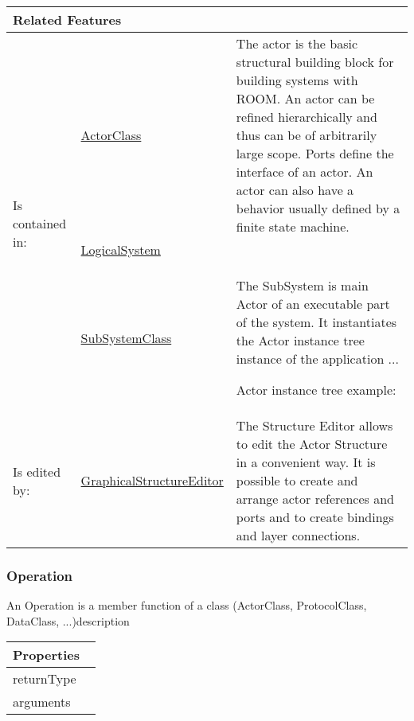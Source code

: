			\vspace{\baselineskip}
			\begingroup
			\renewcommand{\arraystretch}{1.8} %
			\parbox{\textwidth}{
			\begin{longtable}{l l p{}}
				\multicolumn{2}{l}{\textbf{\large Related Features}} & \\
				\hline
			\multirow{3}{*}{Is contained in:} & \tabitem \hyperlink{ref:ActorClass}{ActorClass}  & The actor is the basic structural building block for building systems with ROOM. An actor can be refined hierarchically and thus can be of arbitrarily large scope. Ports define the interface of an actor. An actor can also have a behavior usually defined by a finite state machine. \\
			& \tabitem \hyperlink{ref:LogicalSystem}{LogicalSystem}  &  \\
			& \tabitem \hyperlink{ref:SubSystemClass}{SubSystemClass}  & The SubSystem is main Actor of an executable part of the system. It instantiates the Actor instance tree instance of the application ...
				
				Actor instance tree example:
			 \\
			\hline
			Is edited by: & \tabitem \hyperlink{ref:GraphicalStructureEditor}{GraphicalStructureEditor}  & The Structure Editor allows to edit the Actor Structure in a convenient way. It is possible to create and arrange actor references and ports and to create bindings and layer connections.\\
			\hline
			\end{longtable}	
			}
			\endgroup
			\vspace{\baselineskip}
			
			
		
		\subsubsection{Operation}
			\hypertarget{ref:Operation}{}
			
			An Operation is a member function of a class (ActorClass, ProtocolClass, DataClass, ...)description 
			
			\vspace{\baselineskip}
			\begingroup
			\renewcommand{\arraystretch}{1.8} %
			\parbox{\textwidth}{
			\begin{longtable}{l p{}}
				\multicolumn{2}{l}{\textbf{\large Properties}} \\
				\hline
			\tabitem returnType & \\
			\tabitem arguments & \\
			\end{longtable}	
			}
			\endgroup
			\vspace{\baselineskip}
			
